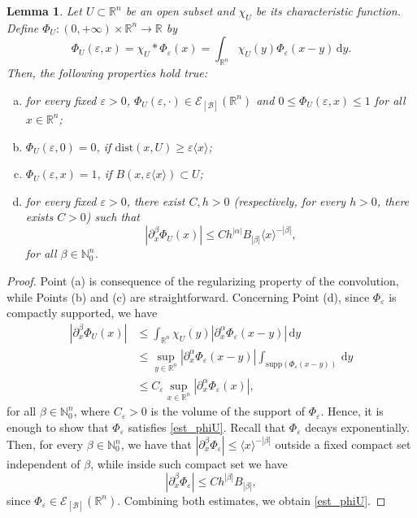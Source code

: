 \documentclass[11pt,reqno]{amsart}
\numberwithin{equation}{section}
\newtheorem{lemma}[theorem]{Lemma}
\newcommand{\R}{{\mathbb{R}}} %
\newcommand{\N}{{\mathbb{N}}} %
\newcommand{\B}{{\mathcal{B}}} %
\begin{document}
\begin{lemma}\label{lem:anpartun}
	Let $U\subset\mathbb{R}^n$ be an open subset and $\chi_U$ be its characteristic function. Define $\Phi_U:(0,+\infty)\times\mathbb{R}^n\to\mathbb{R}$ by
	\[\Phi_U(\varepsilon,x) = \chi_U * \Phi_\varepsilon(x) = \int_{\mathbb{R}^n}\chi_U(y)\Phi_\varepsilon(x-y)\,\mathrm{d}y.\]
	Then, the following properties hold true:
	\begin{enumerate}[(a)]
		\item for every fixed $\varepsilon>0$, $\Phi_U(\varepsilon,\cdot)\in\mathcal{E}_{[\B]}(\mathbb{R}^n)$ and $0\leq\Phi_U(\varepsilon,x)\leq 1$ for all $x\in\mathbb{R}^n$;
		\item $\Phi_U(\varepsilon,0)=0$, if $\mathrm{dist}(x,U)\geq\varepsilon\langle x\rangle$;
		\item $\Phi_U(\varepsilon,x)=1$, if $B(x,\varepsilon\langle x\rangle)\subset U$;
		\item for every fixed $\varepsilon>0$, there exist $C,h>0$ (respectively, for every $h>0$, there exists $C>0$) such that
		\begin{equation}\label{est_phiU}
			|\partial_x^\beta\Phi_U(x)|\leq Ch^{|\alpha|}B_{|\beta|} \langle x \rangle^{-|\beta|},
		\end{equation}
		for all $\beta\in\mathbb{N}_0^n$. 
	\end{enumerate}
\end{lemma}
%
\begin{proof}
	Point (a) is consequence of the regularizing property of the convolution, while Points (b) and (c) are straightforward. 
	Concerning Point (d), since $\Phi_\varepsilon$ is compactly supported, we have
	\begin{align*}
		|\partial_x^\beta\Phi_U(x)| & \leq \int_{\mathbb{R}^n}\chi_U(y)|\partial_x^\alpha \Phi_\varepsilon(x-y)|\,\mathrm{d}y\\
		& \leq \sup_{y\in\mathbb{R}^n}|\partial_x^\alpha\Phi_\varepsilon(x-y)|\int_{\text{supp}(\Phi_\varepsilon(x-y))}\,\mathrm{d}y\\
		& \leq C_\varepsilon\sup_{x\in\mathbb{R}^n}|\partial_x^\alpha\Phi_\varepsilon(x)|,
	\end{align*}
	for all $\beta\in\N_0^n$, where $C_\varepsilon>0$ is the volume of the support of $\Phi_\varepsilon$. 
	Hence, it is enough to show that $\Phi_\varepsilon$ satisfies \eqref{est_phiU}. 
	Recall that $\Phi_\varepsilon$ decays exponentially. Then, for every $\beta\in\mathbb{N}_0^n$, we have that 
	$|\partial_x^{\beta}\Phi_\varepsilon|\leq \langle x\rangle^{-|\beta|}$ outside a fixed compact set independent of $\beta$, while inside such compact set we have
	\[|\partial_x^{\beta}\Phi_\varepsilon|\leq Ch^{|\beta|}B_{|\beta|},\]
	since $\Phi_\varepsilon\in\mathcal{E}_{[\B]}(\R^n)$. Combining both estimates, we obtain \eqref{est_phiU}.
\end{proof}
\end{document}
